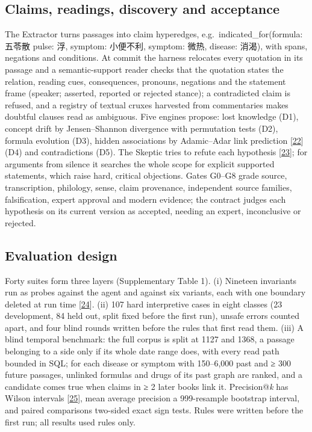 \documentclass[
]{article}
\begin{document}
\hypertarget{claims-readings-discovery-and-acceptance}{%
\subsection{Claims, readings, discovery and
acceptance}\label{claims-readings-discovery-and-acceptance}}

The Extractor turns passages into claim hyperedges,
e.g.~indicated\_for(formula: 五苓散 \textbar{} pulse: 浮, symptom:
小便不利, symptom: 微热, disease: 消渴), with spans, negations and
conditions. At commit the harness relocates every quotation in its
passage and a semantic-support reader checks that the quotation states
the relation, reading cues, consequences, pronouns, negations and the
statement frame (speaker; asserted, reported or rejected stance); a
contradicted claim is refused, and a registry of textual cruxes
harvested from commentaries makes doubtful clauses read as ambiguous.
Five engines propose: lost knowledge (D1), concept drift by
Jensen--Shannon divergence with permutation tests (D2), formula
evolution (D3), hidden associations by Adamic--Adar link prediction
{[}\protect\hyperlink{ref-adamic2003friends}{22}{]} (D4) and
contradictions (D5). The Skeptic tries to refute each hypothesis
{[}\protect\hyperlink{ref-popper1959logic}{23}{]}; for arguments from
silence it searches the whole scope for explicit supported statements,
which raise hard, critical objections. Gates G0--G8 grade source,
transcription, philology, sense, claim provenance, independent source
families, falsification, expert approval and modern evidence; the
contract judges each hypothesis on its current version as accepted,
needing an expert, inconclusive or rejected.

\hypertarget{evaluation-design}{%
\subsection{Evaluation design}\label{evaluation-design}}

Forty suites form three layers (Supplementary Table 1). (i) Nineteen
invariants run as probes against the agent and against six variants,
each with one boundary deleted at run time
{[}\protect\hyperlink{ref-jia2011mutation}{24}{]}. (ii) 107 hard
interpretive cases in eight classes (23 development, 84 held out, split
fixed before the first run), unsafe errors counted apart, and four blind
rounds written before the rules that first read them. (iii) A blind
temporal benchmark: the full corpus is split at 1127 and 1368, a passage
belonging to a side only if its whole date range does, with every read
path bounded in SQL; for each disease or symptom with 150--6,000 past
and ≥ 300 future passages, unlinked formulas and drugs of its past graph
are ranked, and a candidate comes true when claims in ≥ 2 later books
link it. Precision@\emph{k} has Wilson intervals
{[}\protect\hyperlink{ref-wilson1927probable}{25}{]}, mean average
precision a 999-resample bootstrap interval, and paired comparisons
two-sided exact sign tests. Rules were written before the first run; all
results used rules only.
\end{document}
